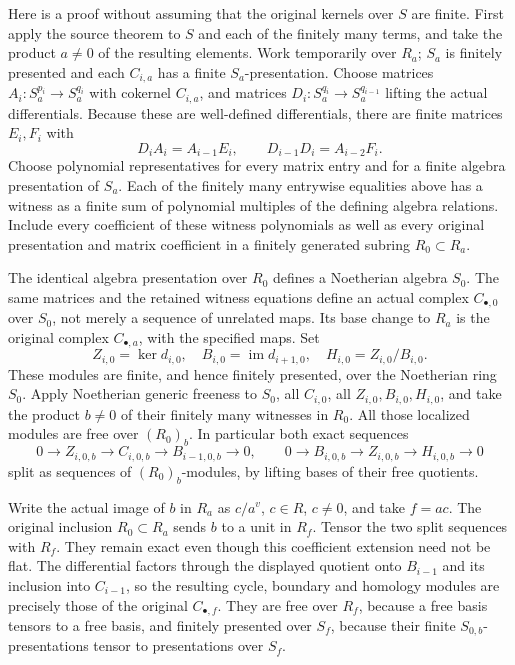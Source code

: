 Here is a proof without assuming that the original kernels over \(S\) are finite. First apply the source theorem to \(S\) and each of the finitely many terms, and take the product \(a\ne0\) of the resulting elements. Work temporarily over \(R_a\); \(S_a\) is finitely presented and each \(C_{i,a}\) has a finite \(S_a\)-presentation. Choose matrices \(A_i:S_a^{p_i}\to S_a^{q_i}\) with cokernel \(C_{i,a}\), and matrices \(D_i:S_a^{q_i}\to S_a^{q_{i-1}}\) lifting the actual differentials. Because these are well-defined differentials, there are finite matrices \(E_i,F_i\) with \[
 D_i A_i=A_{i-1}E_i,\qquad
 D_{i-1}D_i=A_{i-2}F_i.
\] Choose polynomial representatives for every matrix entry and for a finite algebra presentation of \(S_a\). Each of the finitely many entrywise equalities above has a witness as a finite sum of polynomial multiples of the defining algebra relations. Include every coefficient of these witness polynomials as well as every original presentation and matrix coefficient in a finitely generated subring \(R_0\subset R_a\).

The identical algebra presentation over \(R_0\) defines a Noetherian algebra \(S_0\). The same matrices and the retained witness equations define an actual complex \(C_{\bullet,0}\) over \(S_0\), not merely a sequence of unrelated maps. Its base change to \(R_a\) is the original complex \(C_{\bullet,a}\), with the specified maps. Set \[
 Z_{i,0}=\ker d_{i,0},\quad B_{i,0}=\operatorname{im}d_{i+1,0},
 \quad H_{i,0}=Z_{i,0}/B_{i,0}.
\] These modules are finite, and hence finitely presented, over the Noetherian ring \(S_0\). Apply Noetherian generic freeness to \(S_0\), all \(C_{i,0}\), all \(Z_{i,0},B_{i,0},H_{i,0}\), and take the product \(b\ne0\) of their finitely many witnesses in \(R_0\). All those localized modules are free over \((R_0)_b\). In particular both exact sequences \[
 0\to Z_{i,0,b}\to C_{i,0,b}\to B_{i-1,0,b}\to0,\qquad
 0\to B_{i,0,b}\to Z_{i,0,b}\to H_{i,0,b}\to0
\] split as sequences of \((R_0)_b\)-modules, by lifting bases of their free quotients.

Write the actual image of \(b\) in \(R_a\) as \(c/a^v\), \(c\in R\), \(c\ne0\), and take \(f=ac\). The original inclusion \(R_0\subset R_a\) sends \(b\) to a unit in \(R_f\). Tensor the two split sequences with \(R_f\). They remain exact even though this coefficient extension need not be flat. The differential factors through the displayed quotient onto \(B_{i-1}\) and its inclusion into \(C_{i-1}\), so the resulting cycle, boundary and homology modules are precisely those of the original \(C_{\bullet,f}\). They are free over \(R_f\), because a free basis tensors to a free basis, and finitely presented over \(S_f\), because their finite \(S_{0,b}\)-presentations tensor to presentations over \(S_f\).

